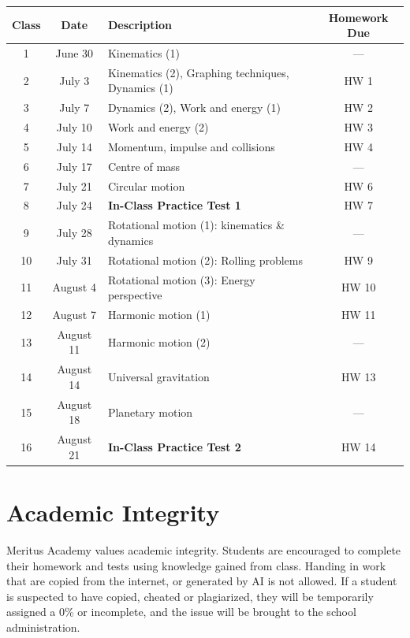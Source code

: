 \documentclass{../../oss-handout}
\begin{document}
\bgroup
\def\arraystretch{1.1}
\begin{center}
  \begin{tabular}{|c|c|p{4in}|c|}
    \hline
    \rowcolor{lightgray}
    \textbf{Class} & \textbf{Date} & \textbf{Description} &
    \textbf{Homework Due} \\
    \hline\hline
    1  & June 30 & Kinematics (1) & --- \\ \hline
    2  & July 3  & Kinematics (2), Graphing techniques, Dynamics (1) & HW 1\\
    \hline
    3  & July 7  & Dynamics (2), Work and energy (1) & HW 2 \\ \hline
    4  & July 10 & Work and energy (2)               & HW 3 \\ \hline
    5  & July 14 & Momentum, impulse and collisions  & HW 4 \\ \hline
    6  & July 17 & Centre of mass                    & ---  \\ \hline
    7  & July 21 & Circular motion                   & HW 6 \\ \hline
    \rowcolor{lightgray!50}
    8  & July 24 & \textbf{In-Class Practice Test 1} & HW 7 \\ \hline
    9  & July 28 & Rotational motion (1): kinematics \& dynamics & --- \\
    \hline
    10 & July 31 & Rotational motion (2): Rolling problems & HW 9 \\ \hline
    11 & August 4  & Rotational motion (3): Energy perspective & HW 10 \\ \hline
    12 & August 7  & Harmonic motion (1)   & HW 11 \\ \hline
    13 & August 11 & Harmonic motion (2)   & ---   \\ \hline
    14 & August 14 & Universal gravitation & HW 13 \\ \hline
    15 & August 18 & Planetary motion      & ---   \\ \hline
    \rowcolor{lightgray!50}
    16 & August 21 & \textbf{In-Class Practice Test 2} & HW 14 \\ \hline
  \end{tabular}
\end{center}
\egroup



\section{Academic Integrity}

Meritus Academy values academic integrity. Students are encouraged to complete
their homework and tests using knowledge gained from class. Handing in work
that are copied from the internet, or generated by AI is not allowed. If a
student is suspected to have copied, cheated or plagiarized, they will be
temporarily assigned a 0\% or incomplete, and the issue will be brought to the
school administration.
\end{document}
